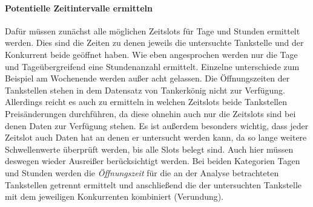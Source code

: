 \documentclass[12pt,a4paper,bibliography=totocnumbered,listof=totocnumbered]{scrartcl}
\begin{document}
\paragraph{Potentielle Zeitintervalle ermitteln}
Dafür müssen zunächst alle möglichen Zeitslots für Tage und Stunden ermittelt werden. Dies sind die Zeiten zu denen jeweils die untersuchte Tankstelle und der Konkurrent beide geöffnet haben. Wie eben angesprochen werden nur die Tage und Tageübergreifend eine Stundenanzahl ermittelt. Einzelne unterschiede zum Beispiel am Wochenende werden außer acht gelassen. Die Öffnungszeiten der Tankstellen stehen in dem Datensatz von Tankerkönig nicht zur Verfügung. Allerdings reicht es auch zu ermitteln in welchen Zeitslots beide Tankstellen Preisänderungen durchführen, da diese ohnehin auch nur die Zeitslots sind bei denen Daten zur Verfügung stehen. Es ist außerdem besonders wichtig, dass jeder Zeitslot auch Daten hat an denen er untersucht werden kann, da so lange weitere Schwellenwerte überprüft werden, bis alle Slots belegt sind. Auch hier müssen deswegen wieder Ausreißer berücksichtigt werden. Bei beiden Kategorien Tagen und Stunden werden die \textit{Öffnungszeit} für die an der Analyse betrachteten Tankstellen getrennt ermittelt und anschließend die der untersuchten Tankstelle mit dem jeweiligen Konkurrenten kombiniert (Verundung).\\
\end{document}
